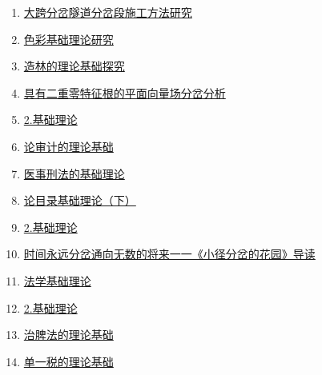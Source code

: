 \documentclass{article}
\begin{document}
\begin{enumerate}
\def\labelenumi{\arabic{enumi}.}
\setcounter{enumi}{13}
\item
  \href{https://www.ixueshu.com/api/search/info/586c8b8cb957527f4217ce50d230be75318947a18e7f9386.html?from=pdf}{{大跨分岔隧道分岔段施工方法研究}}
\item
  \href{https://www.ixueshu.com/api/search/info/c52eb7b044f9bfffd7431665a395e8fe318947a18e7f9386.html?from=pdf}{{色彩基础理论研究}}
\item
  \href{https://www.ixueshu.com/api/search/info/f21b7d05519c591128263b67cacd362b318947a18e7f9386.html?from=pdf}{{造林的理论基础探究}}
\item
  \href{https://www.ixueshu.com/api/search/info/f4c5973e4e895581689cb14f1ffbe82d318947a18e7f9386.html?from=pdf}{{具有二重零特征根的平面向量场分岔分析}}
\item
  \href{https://www.ixueshu.com/api/search/info/16c147a8ae4f4038470ba2d9bf5ba883318947a18e7f9386.html?from=pdf}{{2.基础理论}}
\item
  \href{https://www.ixueshu.com/api/search/info/707a828b3050b9d8fd0046410e8122da318947a18e7f9386.html?from=pdf}{{论审计的理论基础}}
\item
  \href{https://www.ixueshu.com/api/search/info/93bfd537f66e154e277926f0b671e673318947a18e7f9386.html?from=pdf}{{医事刑法的基础理论}}
\item
  \href{https://www.ixueshu.com/api/search/info/c672b6fc6944f3b6cde7b4de16698ffa318947a18e7f9386.html?from=pdf}{{论目录基础理论（下）}}
\item
  \href{https://www.ixueshu.com/api/search/info/c52eb7b044f9bfffbc2f70f14dcf0071318947a18e7f9386.html?from=pdf}{{2.基础理论}}
\item
  \href{https://www.ixueshu.com/api/search/info/af5a20653d8fe20f07f5b7915c1420f8318947a18e7f9386.html?from=pdf}{{时间永远分岔通向无数的将来一一《小径分岔的花园》导读}}
\item
  \href{https://www.ixueshu.com/api/search/info/9ccb7b1c7a71e8ffdab3cbaa5a2b8ddc318947a18e7f9386.html?from=pdf}{{法学基础理论}}
\item
  \href{https://www.ixueshu.com/api/search/info/a0d7bb67273064f3c86d800301c2d25b318947a18e7f9386.html?from=pdf}{{2.基础理论}}
\item
  \href{https://www.ixueshu.com/api/search/info/f21b7d05519c5911fe94471af2c9af50318947a18e7f9386.html?from=pdf}{{治脾法的理论基础}}
\item
  \href{https://www.ixueshu.com/api/search/info/e9d0c5b740fa83064c3efcd3a0e64b76318947a18e7f9386.html?from=pdf}{{单一税的理论基础}}

\end{enumerate}
\end{document}
